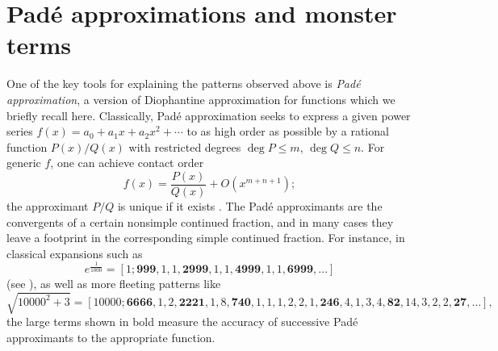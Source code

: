 \documentclass{article}
\numberwithin{equation}{section}
\theoremstyle{definition}
\theoremstyle{remark}
\newcommand{\<}{\left\langle}
\renewcommand{\>}{\right\rangle}
\begin{document}
\section{Pad\'e approximations and monster terms} \label{sec:pade_monster}
One of the key tools for explaining the patterns observed above is \emph{Pad\'e approximation}, a version of Diophantine approximation for functions which we briefly recall here. Classically, Pad\'e approximation seeks to express
a given power series $f(x)=a_0+a_1x+a_2x^2+\cdots$ to as high order as
possible by a rational function $P(x)/Q(x)$ with restricted degrees
$\deg P\leq m$, $\deg Q\leq n$. For generic $f$, one can achieve contact order
\begin{equation*}
  f(x) = \frac{P(x)}{Q(x)} + O(x^{m+n+1});
\end{equation*}
the approximant $P/Q$ is unique if it exists
\cite{WikipediaPade,Baker2012}. The Pad\'e approximants are the convergents of a certain nonsimple continued fraction, and in many cases they leave a footprint in the corresponding simple continued fraction. For instance, in classical expansions such as
\begin{equation}
  e^{\frac{1}{1000}} = [1; \mathbf{999}, 1, 1, \mathbf{2999}, 1, 1, \mathbf{4999}, 1, 1, \mathbf{6999}, \ldots]
\end{equation}
(see \cite{Cohn06,McCabe09}), as well as more fleeting patterns like
\begin{equation}
  \sqrt{10000^2 + 3} = [10000; \mathbf{6666}, 1, 2, \mathbf{2221}, 1, 8, \mathbf{740}, 1, 1, 1, 2, 2, 1, \mathbf{246}, 4, 1, 3, 4, \mathbf{82}, 14, 3, 2, 2, \mathbf{27}, \ldots],
\end{equation}
the large terms shown in bold measure the accuracy of successive Pad\'e approximants to the appropriate function.
\end{document}

